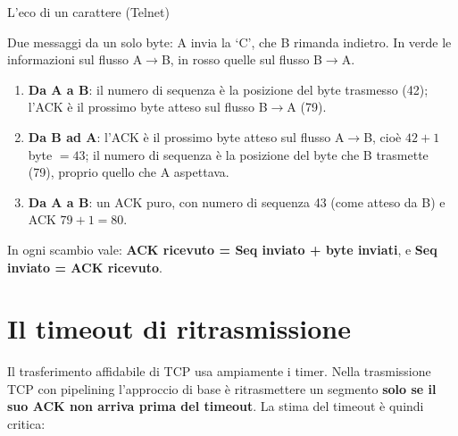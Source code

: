 \begin{esempio}{L'eco di un carattere (Telnet)}
\begin{center}
\end{center}
Due messaggi da un solo byte: A invia la `C', che B rimanda indietro. In verde le informazioni sul flusso
A$\rightarrow$B, in rosso quelle sul flusso B$\rightarrow$A.
\begin{enumerate}
    \item \textbf{Da A a B}: il numero di sequenza è la posizione del byte trasmesso (42); l'ACK è il prossimo byte
          atteso sul flusso B$\rightarrow$A (79).
    \item \textbf{Da B ad A}: l'ACK è il prossimo byte atteso sul flusso A$\rightarrow$B, cioè $42 + 1$ byte $= 43$;
          il numero di sequenza è la posizione del byte che B trasmette (79), proprio quello che A aspettava.
    \item \textbf{Da A a B}: un ACK puro, con numero di sequenza 43 (come atteso da B) e ACK $79 + 1 = 80$.
\end{enumerate}
In ogni scambio vale: \textbf{ACK ricevuto = Seq inviato + byte inviati}, e \textbf{Seq inviato = ACK ricevuto}.
\end{esempio}

\section{Il timeout di ritrasmissione}

Il trasferimento affidabile di TCP usa ampiamente i timer. Nella trasmissione TCP con pipelining
l'approccio di base è ritrasmettere un segmento \textbf{solo se il suo ACK non arriva prima del timeout}.
La stima del timeout è quindi critica:

